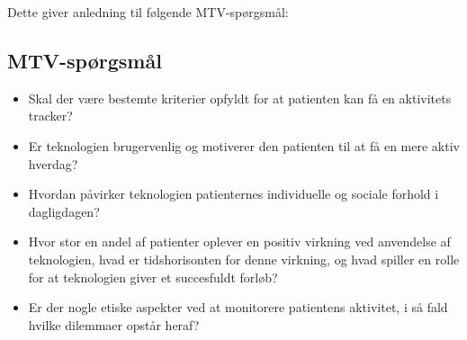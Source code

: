 \noindent
Dette giver anledning til følgende MTV-spørgsmål: 


\subsection{MTV-spørgsmål}
\begin{itemize}
\item Skal der være bestemte kriterier opfyldt for at patienten kan få en aktivitets tracker?
\item Er teknologien brugervenlig og motiverer den patienten til at få en mere aktiv hverdag?
\item Hvordan påvirker teknologien patienternes individuelle og sociale forhold i dagligdagen?
\item Hvor stor en andel af patienter oplever en positiv virkning ved anvendelse af teknologien, hvad er tidshorisonten for denne virkning, og hvad spiller en rolle for at teknologien giver et succesfuldt forløb?
\item Er der nogle etiske aspekter ved at monitorere patientens aktivitet, i så fald hvilke dilemmaer opstår heraf?
\end{itemize} 

